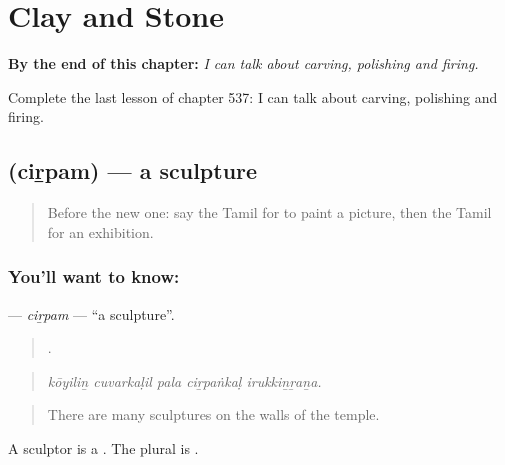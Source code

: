 
\chapter{Clay and Stone}
\label{ch:ta-clay-and-stone}

\begin{chapteropening}
\textbf{By the end of this chapter:} \emph{I can talk about carving, polishing and firing.}

Complete the last lesson of chapter 537: I can talk about carving, polishing and firing.
\end{chapteropening}

\section[\texorpdfstring{\ta{சிற்பம்} (ciṟpam)}{சிற்பம் (ciṟpam)}]{ (ciṟpam) — a sculpture}

\label{lesson:TA-C537-cirpam}



\begin{quote}
Before the new one: say the Tamil for to paint a picture, then the Tamil for an exhibition.
\end{quote}

\subsection*{You'll want to know: }
\textbf{} — \emph{ciṟpam} — \textquotedblleft{}a sculpture\textquotedblright{}.

\begin{quote}
    .
\end{quote}

\begin{quote}
\emph{kōyiliṉ cuvarkaḷil pala ciṟpaṅkaḷ irukkiṉṟaṉa.}
\end{quote}

\begin{quote}
There are many sculptures on the walls of the temple.
\end{quote}

A sculptor is a . The plural is .

